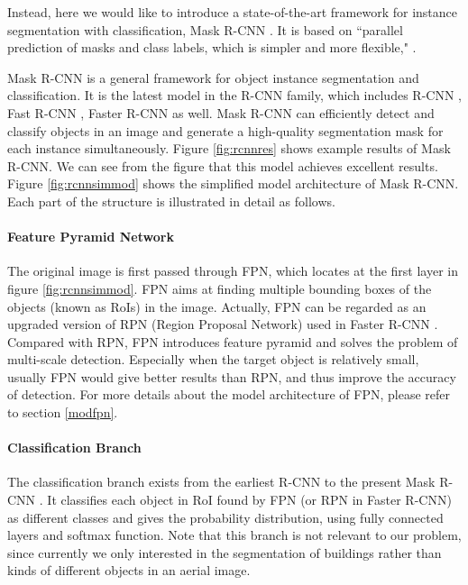 Instead, here we would like to introduce a state-of-the-art framework for instance segmentation with classification, Mask R-CNN \cite{maskrcnn}. It is based on ``parallel prediction of masks and class labels, which is simpler and more flexible," \cite{maskrcnn}.

Mask R-CNN is a general framework for object instance segmentation and classification. It is the latest model in the R-CNN family, which includes R-CNN \cite{rcnn}, Fast R-CNN \cite{fastrcnn}, Faster R-CNN \cite{fasterrcnn} as well. Mask R-CNN can efficiently detect and classify objects in an image and generate a high-quality segmentation mask for each instance simultaneously. Figure \ref{fig:rcnnres} shows example results of Mask R-CNN. We can see from the figure that this model achieves excellent results. Figure \ref{fig:rcnnsimmod} shows the simplified model architecture of Mask R-CNN. Each part of the structure is illustrated in detail as follows.




\paragraph{Feature Pyramid Network} The original image is first passed through FPN, which locates at the first layer in figure \ref{fig:rcnnsimmod}. FPN aims at finding multiple bounding boxes of the objects (known as RoIs) in the image. Actually, FPN can be regarded as an upgraded version of RPN (Region Proposal Network) used in Faster R-CNN \cite{fasterrcnn}. Compared with RPN, FPN introduces feature pyramid and solves the problem of multi-scale detection. Especially when the target object is relatively small, usually FPN would give better results than RPN, and thus improve the accuracy of detection. For more details about the model architecture of FPN, please refer to section \ref{modfpn}.

\paragraph{Classification Branch}
The classification branch exists from the earliest R-CNN \cite{rcnn} to the present Mask R-CNN \cite{maskrcnn}. It classifies each object in RoI found by FPN (or RPN in Faster R-CNN) as different classes and gives the probability distribution, using fully connected layers and softmax function. Note that this branch is not relevant to our problem, since currently we only interested in the segmentation of buildings rather than kinds of different objects in an aerial image.

